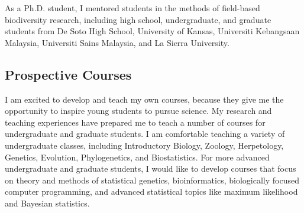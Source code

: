 As a Ph.D. student, I mentored students in the methods of field-based
biodiversity research, including high school, undergraduate, and graduate
students from De Soto High School, University of Kansas, Universiti Kebangsaan
Malaysia, Universiti Sains Malaysia, and La Sierra University.

\subsection*{Prospective Courses}

I am excited to develop and teach my own courses, because they give me the
opportunity to inspire young students to pursue science.
My research and teaching experiences have prepared me to teach a number of
courses for undergraduate and graduate students.
I am comfortable teaching a variety of undergraduate classes, including
Introductory Biology, Zoology, Herpetology, Genetics, Evolution, Phylogenetics,
and Biostatistics.
For more advanced undergraduate and graduate students, I would like to develop
courses that focus on theory and methods of statistical genetics,
bioinformatics, biologically focused computer programming, and advanced
statistical topics like maximum likelihood and Bayesian statistics.

